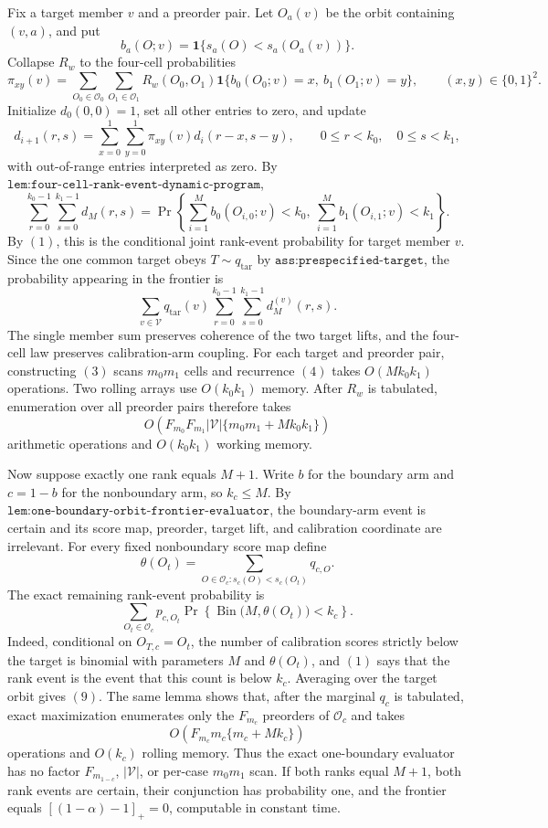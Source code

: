 Fix a target member \(v\) and a preorder pair. Let \(O_a(v)\) be the orbit containing \((v,a)\), and put
\[
b_a(O;v)=\mathbf 1\{s_a(O)<s_a(O_a(v))\}.
\]
Collapse \(R_w\) to the four-cell probabilities
\[
\pi_{xy}(v)=\sum_{O_0\in\mathcal O_0}\sum_{O_1\in\mathcal O_1}R_w(O_0,O_1)
\mathbf 1\{b_0(O_0;v)=x,\ b_1(O_1;v)=y\},
\qquad (x,y)\in\{0,1\}^2.
\tag{3}
\]
Initialize \(d_0(0,0)=1\), set all other entries to zero, and update
\[
d_{i+1}(r,s)=\sum_{x=0}^1\sum_{y=0}^1\pi_{xy}(v)d_i(r-x,s-y),
\qquad 0\le r<k_0,\quad 0\le s<k_1,
\tag{4}
\]
with out-of-range entries interpreted as zero. By \(\texttt{lem:four-cell-rank-event-dynamic-program}\),
\[
\sum_{r=0}^{k_0-1}\sum_{s=0}^{k_1-1}d_M(r,s)
=\Pr\!\left\{\sum_{i=1}^M b_0(O_{i,0};v)<k_0,\ \sum_{i=1}^M b_1(O_{i,1};v)<k_1\right\}.
\tag{5}
\]
By \((1)\), this is the conditional joint rank-event probability for target member \(v\). Since the one common target obeys \(T\sim q_{\mathrm{tar}}\) by \(\texttt{ass:prespecified-target}\), the probability appearing in the frontier is
\[
\sum_{v\in\mathcal V}q_{\mathrm{tar}}(v)
\sum_{r=0}^{k_0-1}\sum_{s=0}^{k_1-1}d_M^{(v)}(r,s).
\tag{6}
\]
The single member sum preserves coherence of the two target lifts, and the four-cell law preserves calibration-arm coupling. For each target and preorder pair, constructing \((3)\) scans \(m_0m_1\) cells and recurrence \((4)\) takes \(O(Mk_0k_1)\) operations. Two rolling arrays use \(O(k_0k_1)\) memory. After \(R_w\) is tabulated, enumeration over all preorder pairs therefore takes
\[
O\!\left(F_{m_0}F_{m_1}|\mathcal V|\{m_0m_1+Mk_0k_1\}\right)
\tag{7}
\]
arithmetic operations and \(O(k_0k_1)\) working memory.

Now suppose exactly one rank equals \(M+1\). Write \(b\) for the boundary arm and \(c=1-b\) for the nonboundary arm, so \(k_c\le M\). By \(\texttt{lem:one-boundary-orbit-frontier-evaluator}\), the boundary-arm event is certain and its score map, preorder, target lift, and calibration coordinate are irrelevant. For every fixed nonboundary score map define
\[
\theta(O_t)=\sum_{O\in\mathcal O_c:s_c(O)<s_c(O_t)}q_{c,O}.
\tag{8}
\]
The exact remaining rank-event probability is
\[
\sum_{O_t\in\mathcal O_c}p_{c,O_t}
\Pr\!\left\{\operatorname{Bin}\bigl(M,\theta(O_t)\bigr)<k_c\right\}.
\tag{9}
\]
Indeed, conditional on \(O_{T,c}=O_t\), the number of calibration scores strictly below the target is binomial with parameters \(M\) and \(\theta(O_t)\), and \((1)\) says that the rank event is the event that this count is below \(k_c\). Averaging over the target orbit gives \((9)\). The same lemma shows that, after the marginal \(q_c\) is tabulated, exact maximization enumerates only the \(F_{m_c}\) preorders of \(\mathcal O_c\) and takes
\[
O\!\left(F_{m_c}m_c\{m_c+Mk_c\}\right)
\tag{10}
\]
operations and \(O(k_c)\) rolling memory. Thus the exact one-boundary evaluator has no factor \(F_{m_{1-c}}\), \(|\mathcal V|\), or per-case \(m_0m_1\) scan. If both ranks equal \(M+1\), both rank events are certain, their conjunction has probability one, and the frontier equals \([(1-\alpha)-1]_+=0\), computable in constant time.

